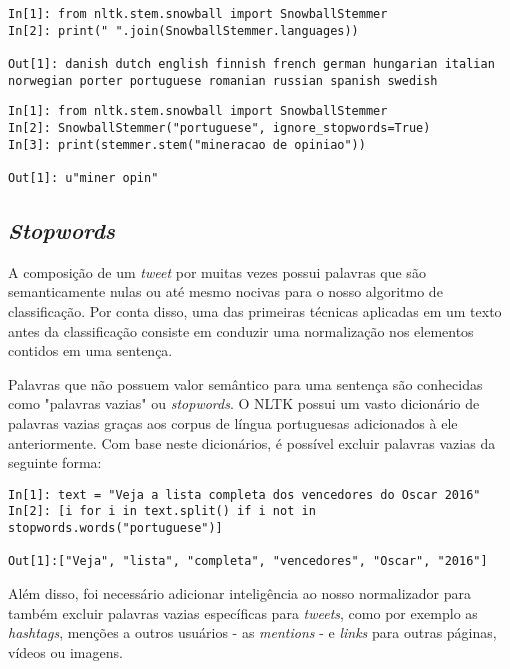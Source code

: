 \begin{lstlisting}[style=python, frame=single]
In[1]: from nltk.stem.snowball import SnowballStemmer
In[2]: print(" ".join(SnowballStemmer.languages))

Out[1]: danish dutch english finnish french german hungarian italian
norwegian porter portuguese romanian russian spanish swedish
\end{lstlisting}



\begin{lstlisting}[style=python, frame=single]
In[1]: from nltk.stem.snowball import SnowballStemmer
In[2]: SnowballStemmer("portuguese", ignore_stopwords=True)
In[3]: print(stemmer.stem("mineracao de opiniao"))

Out[1]: u"miner opin"
\end{lstlisting}


\subsection{\textit{Stopwords}}

A composição de um \textit{tweet} por muitas vezes possui palavras que são semanticamente nulas ou até mesmo nocivas para o nosso algoritmo de classificação. Por conta disso, uma das primeiras técnicas aplicadas em um texto antes da classificação consiste em conduzir uma normalização nos elementos contidos em uma sentença.

Palavras que não possuem valor semântico para uma sentença são conhecidas como "palavras vazias" ou \textit{stopwords}. O NLTK possui um vasto dicionário de palavras vazias graças aos corpus de língua portuguesas adicionados à ele anteriormente. Com base neste dicionários, é possível excluir palavras vazias da seguinte forma:

\begin{lstlisting}[style=python, frame=single]
In[1]: text = "Veja a lista completa dos vencedores do Oscar 2016"
In[2]: [i for i in text.split() if i not in stopwords.words("portuguese")]

Out[1]:["Veja", "lista", "completa", "vencedores", "Oscar", "2016"]
\end{lstlisting}

Além disso, foi necessário adicionar inteligência ao nosso normalizador para também excluir palavras vazias específicas para \textit{tweets}, como por exemplo as \textit{hashtags}, menções a outros usuários - as \textit{mentions} - e \textit{links} para outras páginas, vídeos ou imagens.


